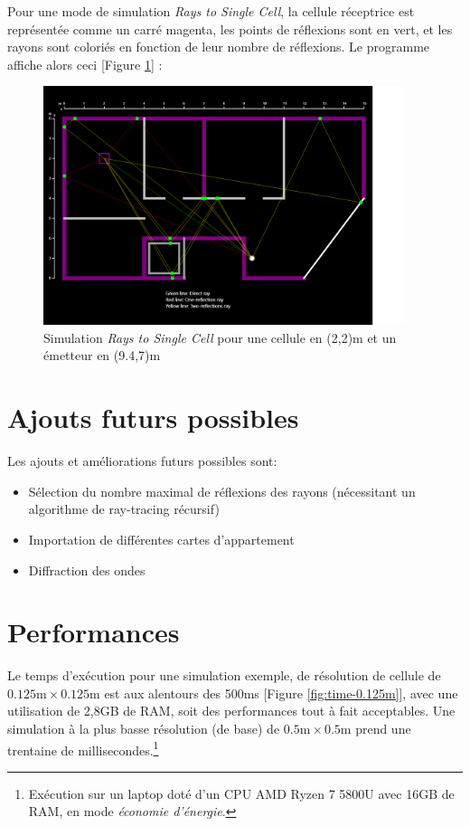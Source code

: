 Pour une mode de simulation \textit{Rays to Single Cell}, la cellule réceptrice est représentée comme un carré magenta, les points de réflexions sont en vert, et les rayons sont coloriés en fonction de leur nombre de réflexions. Le programme affiche alors ceci [Figure \ref{fig:simu-single-cell}] :
\begin{figure}[H]
    \centering
    \includegraphics[width=0.94\textwidth]{latex/images/single-cell.png}
    \caption{Simulation \textit{Rays to Single Cell} pour une cellule en (2,2)m et un émetteur en (9.4,7)m}
    \label{fig:simu-single-cell}
\end{figure}

\section{Ajouts futurs possibles}
Les ajouts et améliorations futurs possibles sont:
\begin{itemize}
    \item Sélection du nombre maximal de réflexions des rayons (nécessitant un algorithme de ray-tracing récursif)
    \item Importation de différentes cartes d'appartement
    \item Diffraction des ondes
\end{itemize}

\section{Performances}
Le temps d'exécution pour une simulation exemple, de résolution de cellule de $0.125\mathrm{m}\times0.125\mathrm{m}$ est aux alentours des 500ms [Figure \ref{fig:time-0.125m}], avec une utilisation de 2,8GB de RAM, soit des performances tout à fait acceptables. Une simulation à la plus basse résolution (de base) de $0.5\mathrm{m}\times0.5\mathrm{m}$ prend une trentaine de millisecondes.\footnote{Exécution sur un laptop doté d'un CPU AMD Ryzen 7 5800U avec 16GB de RAM, en mode \textit{économie d'énergie}.}

